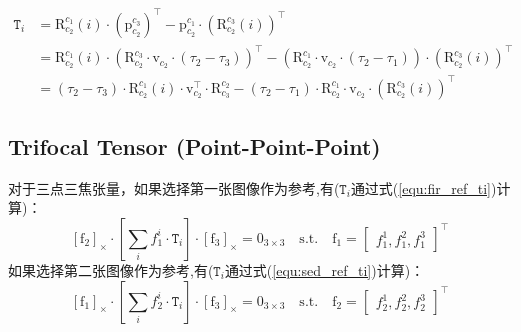 \documentclass[12pt, onecolumn]{article}
\newcommand\liehat[1]{\left[ #1 \right]_\times}
\newcommand\bsm[1]{\boldsymbol{\mathrm{#1}}}
\newcommand\rotation[2]{{\bsm{R}_{#1}^{#2}}}
\newcommand\translation[2]{{\bsm{p}_{#1}^{#2}}}
\begin{document}
	\begin{equation}
	\label{equ:sed_ref_ti}
	\begin{aligned}
	\texttt{T}_i&=\rotation{c_2}{c_1}(i)\cdot\left( \translation{c_2}{c_3}\right)^\top-\translation{c_2}{c_1}\cdot\left(\rotation{c_2}{c_3}(i)\right)^\top
	\\
	&=\rotation{c_2}{c_1}(i)\cdot\left(
	\rotation{c_2}{c_3}\cdot\bsm{v}_{c_2} \cdot\left( \tau_2-\tau_3\right)
	\right)^\top-
	\left( 
	\rotation{c_2}{c_1}\cdot \bsm{v}_{c_2} \cdot\left( \tau_2-\tau_1\right)
	\right) 
	\cdot\left(\rotation{c_2}{c_3}(i)\right)^\top
	\\
	&=\left( \tau_2-\tau_3\right)\cdot\rotation{c_2}{c_1}(i)\cdot\bsm{v}_{c_2}^\top\cdot\rotation{c_3}{c_2}-
	\left( \tau_2-\tau_1\right)\cdot\rotation{c_2}{c_1}\cdot \bsm{v}_{c_2}\cdot\left(\rotation{c_2}{c_3}(i)\right)^\top
	\end{aligned}
	\end{equation}
	\subsection{Trifocal Tensor (Point-Point-Point)}
	对于三点三焦张量，如果选择第一张图像作为参考,有($\texttt{T}_i$通过式(\ref{equ:fir_ref_ti})计算)：
	\begin{equation}
	\liehat{\bsm{f}_2}\cdot\left[ \sum_{i}f_1^i\cdot\texttt{T}_i\right]\cdot\liehat{\bsm{f}_3}=\bsm{0}_{3\times 3}
	\quad\mathrm{s.t.}\quad
	\bsm{f}_1=\begin{bmatrix}
	f_1^1,f_1^2,f_1^3
	\end{bmatrix}^\top
	\end{equation}
	如果选择第二张图像作为参考,有($\texttt{T}_i$通过式(\ref{equ:sed_ref_ti})计算)：
	\begin{equation}
	\liehat{\bsm{f}_1}\cdot\left[ \sum_{i}f_2^i\cdot\texttt{T}_i\right]\cdot\liehat{\bsm{f}_3}=\bsm{0}_{3\times 3}
	\quad\mathrm{s.t.}\quad
	\bsm{f}_2=\begin{bmatrix}
	f_2^1,f_2^2,f_2^3
	\end{bmatrix}^\top
	\end{equation}
	
	\newpage
	
	
		
	\newpage
\end{document}
